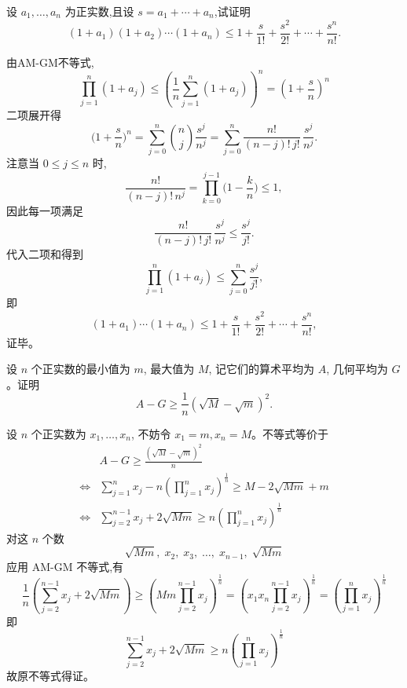 \begin{questions}
    \question 设 $a_1,\dots,a_n$ 为正实数,且设 $s=a_1+\cdots+a_n$,试证明
    \[
    (1+a_1)(1+a_2)\cdots(1+a_n) \le 1+\frac{s}{1!}+\frac{s^2}{2!}+\cdots+\frac{s^n}{n!}.
    \]
    \begin{solution}
        由AM-GM不等式,
        \[
        \prod_{j=1}^n(1+a_j)\le \left(\frac{1}{n}\sum_{j=1}^n(1+a_j)\right)^n=\left(1+\frac{s}{n}\right)^n
        \]
        二项展开得
        \[
        \Big(1+\frac{s}{n}\Big)^n=\sum_{j=0}^n\binom{n}{j}\frac{s^j}{n^j}
        =\sum_{j=0}^n\frac{n!}{(n-j)!\,j!}\,\frac{s^j}{n^j}.
        \]
        注意当 $0\le j\le n$ 时,
        \[
        \frac{n!}{(n-j)!\,n^j}=\prod_{k=0}^{j-1}\Big(1-\frac{k}{n}\Big)\le 1,
        \]
        因此每一项满足
        \[
        \frac{n!}{(n-j)!\,j!}\,\frac{s^j}{n^j}\le\frac{s^j}{j!}.
        \]
        代入二项和得到
        \[
        \prod_{j=1}^n(1+a_j)\le\sum_{j=0}^n\frac{s^j}{j!},
        \]
        即
        \[
        (1+a_1)\cdots(1+a_n)\le 1+\frac{s}{1!}+\frac{s^2}{2!}+\cdots+\frac{s^n}{n!},
        \]
        证毕。
    \end{solution}

    \question 设 $n$ 个正实数的最小值为 $m$, 最大值为 $M$, 记它们的算术平均为 $A$, 几何平均为 $G$。证明
    \[
    A - G \ge \frac{1}{n} \left( \sqrt{M} - \sqrt{m} \right)^2.
    \]
    \begin{solution}
        设 $n$ 个正实数为 $x_1, \dots, x_n$, 不妨令 $x_1 = m, x_n = M$。不等式等价于
        \begin{align*}
        & A - G \ge \frac{\left( \sqrt{M} - \sqrt{m} \right)^2}{n} \\
        \Longleftrightarrow & \sum_{j=1}^n x_j - n \left( \prod_{j=1}^n x_j \right)^{\frac{1}{n}} \ge M - 2\sqrt{Mm} + m \\
        \Longleftrightarrow & \sum_{j=2}^{n-1} x_j + 2\sqrt{Mm} \ge n \left( \prod_{j=1}^n x_j \right)^{\frac{1}{n}}
        \end{align*}
        对这 $n$ 个数
        \[
        \sqrt{Mm}, \; x_2, \; x_3, \; \dots, \; x_{n-1}, \; \sqrt{Mm}
        \]
        应用 AM-GM 不等式,有
        \[
        \frac{1}{n} \left( \sum_{j=2}^{n-1} x_j + 2\sqrt{Mm} \right) \ge \left( Mm \prod_{j=2}^{n-1} x_j \right)^{\frac{1}{n}} = \left( x_1 x_n \prod_{j=2}^{n-1} x_j \right)^{\frac{1}{n}} = \left( \prod_{j=1}^n x_j \right)^{\frac{1}{n}}
        \]
        即
        \[
        \sum_{j=2}^{n-1} x_j + 2\sqrt{Mm} \ge n \left( \prod_{j=1}^n x_j \right)^{\frac{1}{n}}
        \]
        故原不等式得证。
    \end{solution}


\end{questions}
